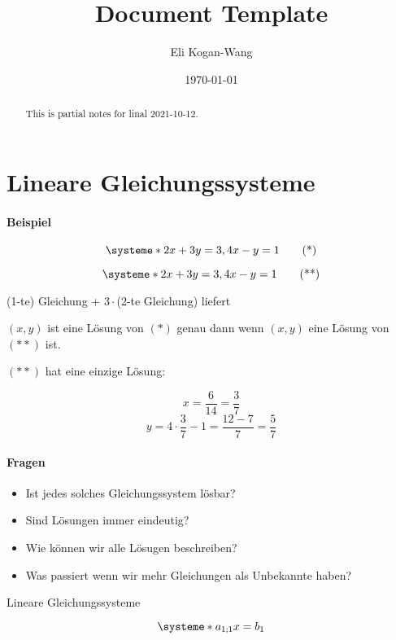 \documentclass[a4paper,12pt]{article}
\title{Document Template}
\author{Eli Kogan-Wang}
\date{\today}
\begin{document}
\renewcommand{\abstractname}{Abstract}
\begin{abstract}
  This is partial notes for linal 2021-10-12.
\end{abstract}
\section{Lineare Gleichungssysteme}

\paragraph*{Beispiel}

\[
  \systeme*{2x+3y=3,4x-y=1}
  \tag{*}
\]

\[
  \systeme*{2x+3y=3,4x-y=1}
  \tag{**}
\]

(1-te) Gleichung + $3\cdot$(2-te Gleichung) liefert

$(x,y)$ ist eine Lösung von $(*)$ genau dann wenn $(x,y)$ eine Lösung von $(**)$ ist.

$(**)$ hat eine einzige Lösung:

$$x=\frac{6}{14}=\frac{3}{7}$$
$$y=4\cdot\frac{3}{7}-1=\frac{12-7}{7}=\frac{5}{7}$$

\paragraph*{Fragen}

\begin{itemize}
  \item Ist jedes solches Gleichungssystem lösbar?
  \item Sind Lösungen immer eindeutig?
  \item Wie können wir alle Lösugen beschreiben?
  \item Was passiert wenn wir mehr Gleichungen als Unbekannte haben?
\end{itemize}

Lineare Gleichungssysteme


\[
  \systeme*{a_{1;1}x=b_1}
\]
\end{document}
